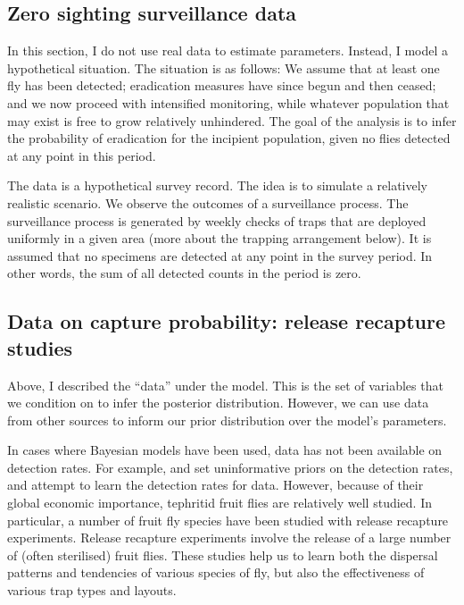 \documentclass[
]{book}
\begin{document}
\hypertarget{zero-sighting-surveillance-data}{%
\subsection{Zero sighting surveillance data}\label{zero-sighting-surveillance-data}}

In this section, I do not use real data to estimate parameters. Instead, I model a hypothetical situation. The situation is as follows: We assume that at least one fly has been detected; eradication measures have since begun and then ceased; and we now proceed with intensified monitoring, while whatever population that may exist is free to grow relatively unhindered. The goal of the analysis is to infer the probability of eradication for the incipient population, given no flies detected at any point in this period.

The data is a hypothetical survey record. The idea is to simulate a relatively realistic scenario. We observe the outcomes of a surveillance process. The surveillance process is generated by weekly checks of traps that are deployed uniformly in a given area (more about the trapping arrangement below). It is assumed that no specimens are detected at any point in the survey period. In other words, the sum of all detected counts in the period is zero.

\hypertarget{data-on-capture-probability-release-recapture-studies}{%
\subsection{Data on capture probability: release recapture studies}\label{data-on-capture-probability-release-recapture-studies}}

Above, I described the ``data'' under the model. This is the set of variables that we condition on to infer the posterior distribution. However, we can use data from other sources to inform our prior distribution over the model's parameters.

In cases where Bayesian models have been used, data has not been available on detection rates. For example, \citet{caley2014} and \citet{keith2013} set uninformative priors on the detection rates, and attempt to learn the detection rates for data. However, because of their global economic importance, tephritid fruit flies are relatively well studied. In particular, a number of fruit fly species have been studied with release recapture experiments. Release recapture experiments involve the release of a large number of (often sterilised) fruit flies. These studies help us to learn both the dispersal patterns and tendencies of various species of fly, but also the effectiveness of various trap types and layouts.
\end{document}
